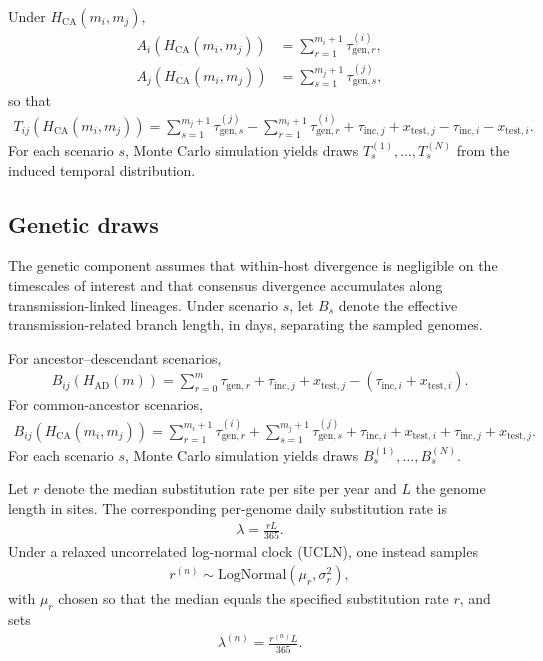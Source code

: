 \documentclass[10pt,a4paper]{article}
\begin{document}
Under $H_{\mathrm{CA}}(m_i,m_j)$,
\begin{align}
A_i\!\left(H_{\mathrm{CA}}(m_i,m_j)\right)
&=
\sum_{r=1}^{m_i+1}\tau_{\mathrm{gen},r}^{(i)},\\
A_j\!\left(H_{\mathrm{CA}}(m_i,m_j)\right)
&=
\sum_{s=1}^{m_j+1}\tau_{\mathrm{gen},s}^{(j)},
\end{align}
so that
\begin{align}
T_{ij}\!\left(H_{\mathrm{CA}}(m_i,m_j)\right)
=
\sum_{s=1}^{m_j+1}\tau_{\mathrm{gen},s}^{(j)}
-
\sum_{r=1}^{m_i+1}\tau_{\mathrm{gen},r}^{(i)}
+
\tau_{\mathrm{inc},j} + x_{\mathrm{test},j}
-
\tau_{\mathrm{inc},i} - x_{\mathrm{test},i}.
\label{eq:T_CA}
\end{align}
For each scenario $s$, Monte Carlo simulation yields draws $T_s^{(1)},\ldots,T_s^{(N)}$ from the induced temporal distribution.

\subsection*{Genetic draws}

The genetic component assumes that within-host divergence is negligible on the timescales of interest and that consensus divergence accumulates along transmission-linked lineages. Under scenario $s$, let $B_s$ denote the effective transmission-related branch length, in days, separating the sampled genomes.

For ancestor--descendant scenarios,
\begin{align}
B_{ij}\!\left(H_{\mathrm{AD}}(m)\right)
=
\sum_{r=0}^{m}\tau_{\mathrm{gen},r}
+
\tau_{\mathrm{inc},j} + x_{\mathrm{test},j}
-
\left(\tau_{\mathrm{inc},i} + x_{\mathrm{test},i}\right).
\label{eq:B_AD}
\end{align}
For common-ancestor scenarios,
\begin{align}
B_{ij}\!\left(H_{\mathrm{CA}}(m_i,m_j)\right)
=
\sum_{r=1}^{m_i+1}\tau_{\mathrm{gen},r}^{(i)}
+
\sum_{s=1}^{m_j+1}\tau_{\mathrm{gen},s}^{(j)}
+
\tau_{\mathrm{inc},i} + x_{\mathrm{test},i}
+
\tau_{\mathrm{inc},j} + x_{\mathrm{test},j}.
\label{eq:B_CA}
\end{align}
For each scenario $s$, Monte Carlo simulation yields draws $B_s^{(1)},\ldots,B_s^{(N)}$.

Let $r$ denote the median substitution rate per site per year and $L$ the genome length in sites. The corresponding per-genome daily substitution rate is
\begin{align}
\lambda = \frac{rL}{365}.
\label{eq:lambda_strict}
\end{align}
Under a relaxed uncorrelated log-normal clock (UCLN), one instead samples
\begin{align}
r^{(n)} \sim \mathrm{LogNormal}(\mu_r,\sigma_r^2),
\end{align}
with $\mu_r$ chosen so that the median equals the specified substitution rate $r$, and sets
\begin{align}
\lambda^{(n)} = \frac{r^{(n)}L}{365}.
\label{eq:lambda_relaxed}
\end{align}
\end{document}
